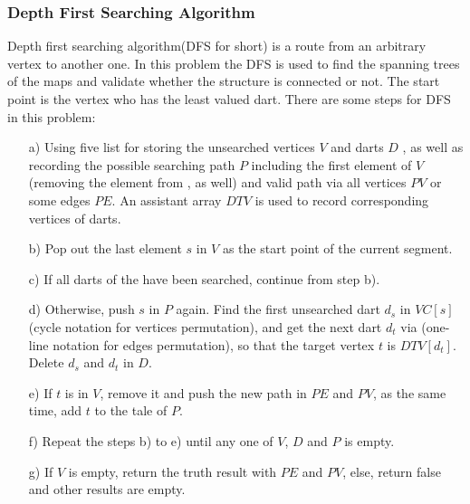 \subsubsection{Depth First Searching Algorithm}
Depth first searching algorithm(DFS for short) is a route from an arbitrary vertex to another one. In this problem the DFS is used to find the spanning trees of the maps and validate whether the structure is connected or not. The start point is the vertex who has the least valued dart. There are some steps for DFS in this problem:

  \begin{itemize}
    \item[a)] Using five list for storing the unsearched vertices \(V\) and darts \(D\) , as well as recording the possible searching path \(P\) including the first element of \(V\) (removing the element from , as well) and valid path via all vertices \(PV\) or some edges \(PE\). An assistant array \(DTV\) is used to record corresponding vertices of darts.
    \item[b)] Pop out the last element \(s\) in \(V\) as the start point of the current segment.
    \item[c)] If all darts of the  have been searched, continue from step b).
    \item[d)] Otherwise, push \(s\) in \(P\) again. Find the first unsearched dart \(d_s\) in \(VC[s]\) (cycle notation for vertices permutation), and get the next dart \(d_t\) via (one-line notation for edges permutation), so that the target vertex \(t\) is \(DTV[d_t]\). Delete \(d_s\) and \(d_t\) in \(D\).
    \item[e)] If \(t\) is in \(V\), remove it and push the new path in \(PE\) and \(PV\), as the same time, add \(t\) to the tale of \(P\).
    \item[f)] Repeat the steps b) to e) until any one of \(V\), \(D\) and \(P\) is empty.
    \item[g)]If \(V\) is empty, return the truth result with \(PE\) and \(PV\), else, return false and other results are empty. 
  \end{itemize}

